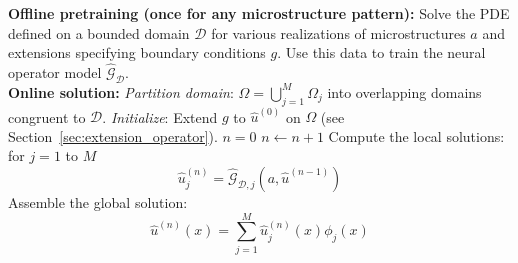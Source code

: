 \documentclass[preprint,11pt]{elsarticle}
\theoremstyle{plain}
\begin{document}
\begin{algorithm}[H]
\caption{Learning-based Domain Decomposition Algorithm}
\label{alg:domain_decomposition}
\begin{algorithmic}
\State \textbf{Offline pretraining (once for any microstructure pattern):}
\State Solve the PDE defined on a bounded domain $\mathcal{D}$ for various realizations of microstructures $a$ and extensions specifying boundary conditions $g$. 
\State Use this data to train the neural operator model $\hat{\mathcal{G}}_\mathcal{D}$. \\ 
\State \textbf{Online solution:}
\State \textit{Partition domain}: $\Omega = \bigcup_{j=1}^{M} \Omega_j$ into overlapping domains congruent to $\mathcal{D}$.
\State \textit{Initialize}: Extend $g$ to $\hat{u}^{(0)}$ on $\Omega$ (see Section~\ref{sec:extension_operator}).
\State $n = 0$
\State $n \gets n + 1$
\State Compute the local solutions: for $j = 1$ to $M$
\begin{equation*}
    \hat{u}_{j}^{(n)} = \hat{\mathcal{G}}_{\mathcal{D},j}(a, \hat{u}^{(n-1)})
\end{equation*}
\State Assemble the global solution:
\begin{equation*} 
    \hat{u}^{(n)}(x) = \sum_{j=1}^M \hat{u}_{j}^{(n)}(x) \phi_j(x)
\end{equation*}
\EndWhile
\end{algorithmic}
\end{algorithm}

\end{document}
